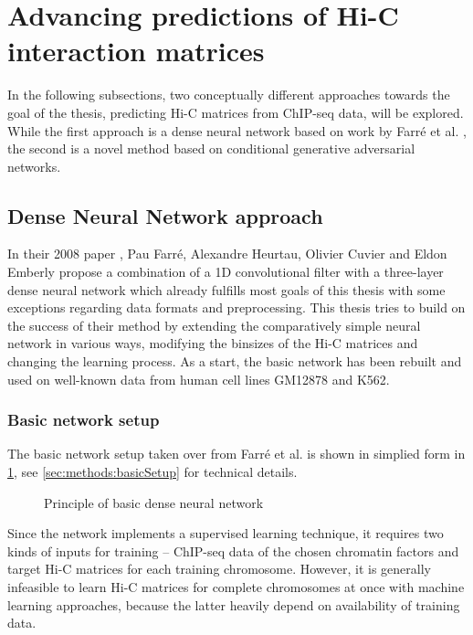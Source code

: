 \section{Advancing predictions of Hi-C interaction matrices}
In the following subsections, two conceptually different approaches towards the goal of the thesis,
predicting Hi-C matrices from ChIP-seq data, will be explored.
While the first approach is a dense neural network based on work by Farr\'e et al. \cite{Farre2018a},
the second is a novel method based on conditional generative adversarial networks.

\subsection{Dense Neural Network approach}\label{sec:DNNapproach}
In their 2008 paper \cite{Farre2018a}, Pau Farr\'e, Alexandre Heurtau, Olivier Cuvier and Eldon Emberly
propose a combination of a 1D convolutional filter with a three-layer dense neural network 
which already fulfills most goals of this thesis with some exceptions regarding data formats and preprocessing.
This thesis tries to build on the success of their method by extending the comparatively simple neural network
in various ways, modifying the binsizes of the Hi-C matrices and changing the learning process.
As a start, the basic network has been rebuilt and used on well-known data from human cell lines GM12878 and K562.

\subsubsection{Basic network setup} \label{sec:improve:basicNetwork}
The basic network setup taken over from Farr\'e et al. \cite{Farre2018a} is shown in simplied form in \cref{fig:improve:priciple_basic_dnn},
see \cref{sec:methods:basicSetup} for technical details.
\begin{figure}[hbp]
    \small
    \centering
    \caption{Principle of basic dense neural network}
    \label{fig:improve:priciple_basic_dnn}
\end{figure}

Since the network implements a supervised learning technique,
it requires two kinds of inputs for training -- ChIP-seq data of the chosen chromatin factors and
target Hi-C matrices for each training chromosome.
However, it is generally infeasible to learn Hi-C matrices for complete chromosomes at once with machine learning approaches, 
because the latter heavily depend on availability of training data.

